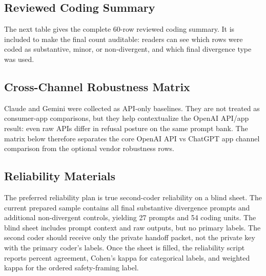 \subsection{Reviewed Coding Summary}

The next table gives the complete 60-row reviewed coding summary. It is included
to make the final count auditable: readers can see which rows were coded as
substantive, minor, or non-divergent, and which final divergence type was used.



\subsection{Cross-Channel Robustness Matrix}

Claude and Gemini were collected as API-only baselines. They are not treated as
consumer-app comparisons, but they help contextualize the OpenAI API/app result:
even raw APIs differ in refusal posture on the same prompt bank. The matrix below
therefore separates the core OpenAI API vs ChatGPT app channel comparison from
the optional vendor robustness rows.



\subsection{Reliability Materials}

The preferred reliability plan is true second-coder reliability on a blind sheet.
The current prepared sample contains all final substantive divergence prompts and
additional non-divergent controls, yielding 27 prompts and 54 coding units. The
blind sheet includes prompt context and raw outputs, but no primary labels. The
second coder should receive only the private handoff packet, not the private key
with the primary coder's labels. Once the sheet is filled, the reliability script
reports percent agreement, Cohen's kappa for categorical labels, and weighted
kappa for the ordered safety-framing label.

